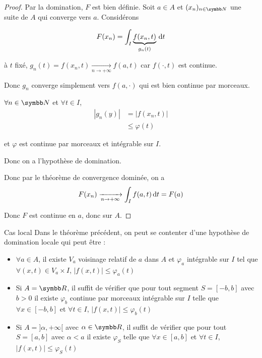 \begin{proof}
    Par la domination, $F$ est bien définie. Soit $a \in A$ et $(x_n)_{n \in \N}$ une suite de $A$ qui converge 
    vers $a$. Considérons 

    $$F(x_n) = \int_I \underbrace{f(x_n, t)}_{g_n(t)} \,\mathrm{d}t$$
    
    à $t$ fixé, $g_n(t) = f(x_n, t) \xrightarrow[n \to + \infty]{} f(a, t)$ car 
    $f(\cdot, t)$ est continue.

    Donc $g_n$ converge simplement vers $f(a, \cdot)$ qui est bien continue par morceaux. 

    $\forall n \in \N$ et $\forall t \in I$, 
    \begin{align}
        |g_n(y)| & = |f(x_n, t)| \\
        & \leqslant \varphi(t)
    \end{align}

    et $\varphi$ est continue par morceaux et intégrable sur $I$.

    Donc on a l'hypothèse de domination. 

    Donc par le théorème de convergence dominée, on a 
    $$F(x_n) \xrightarrow[n \to + \infty]{} \int_I f(a, t) \,\mathrm{d}t = F(a)$$

    Donc $F$ est continue en $a$, donc sur $A$. 
\end{proof}

\begin{theoreme}{Cas local}{}
    Dans le théorème précédent, on peut se contenter d'une hypothèse de domination locale qui 
    peut être : 
    \begin{itemize}
        \item $\forall a \in A$, il existe $V_a$ voisinage relatif de $a$ dans $A$ et $\varphi_a$
        intégrable sur $I$ tel que $\forall (x, t) \in V_a \times I$, $|f(x, t)| \leqslant \varphi_a(t)$
        \item Si $A = \R$, il suffit de vérifier que pour tout segment $S = [-b, b]$ avec $b > 0$ il existe 
        $\varphi_b$ continue par morceaux intégrable sur $I$ telle que 
        $\forall x \in [-b, b]$ et $\forall t \in I$, $|f(x, t)| \leqslant \varphi_b(t)$
        \item Si $A = ]\alpha, + \infty[$ avec $\alpha \in \R$, il suffit de vérifier que pour tout 
        $S = [a, b]$ avec $\alpha <a$ il existe $\varphi_S$ telle que $\forall x \in [a, b]$ et $\forall t \in I$, $|f(x, t)| \leqslant \varphi_S(t)$
    \end{itemize}
\end{theoreme}

